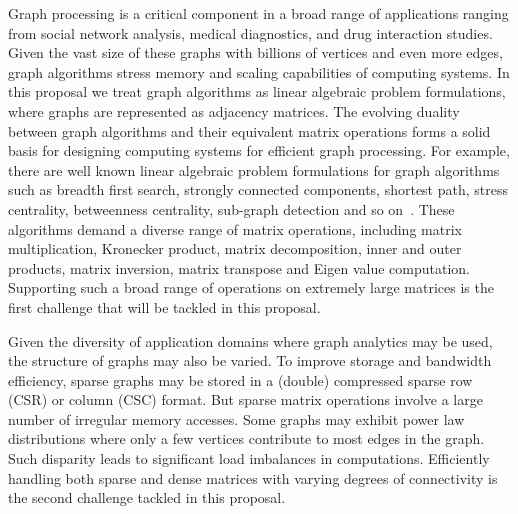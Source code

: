 \noindent
Graph processing is a critical component in a broad range of applications ranging from social network analysis, medical diagnostics, and drug interaction studies.  
Given the vast size of these graphs with billions of vertices and even more edges, graph algorithms stress memory and scaling capabilities of computing systems. 
In this proposal we treat graph algorithms as linear algebraic problem formulations, where graphs are represented as adjacency matrices.  
The evolving duality between graph algorithms and their equivalent matrix operations forms a solid basis for 
designing computing systems %
for efficient graph processing.
For example, there are well known linear algebraic problem formulations for graph algorithms such as breadth first search, strongly connected components, shortest path, stress centrality, betweenness centrality, sub-graph detection and so on~\cite{kepner2011graph}.  
These algorithms demand a diverse range of matrix operations, including matrix multiplication, Kronecker product,  matrix decomposition, inner and outer products, matrix inversion, matrix transpose and Eigen value computation.  
Supporting such a broad range of operations on extremely large matrices is the first challenge that will be tackled in this proposal. 


Given the diversity of application domains where graph analytics may be used, the structure of graphs may also be varied. 
To improve storage and bandwidth efficiency, sparse graphs may be stored in  a (double) compressed sparse row (CSR) or column (CSC) format. 
But sparse matrix operations involve a large number of irregular memory accesses.
Some graphs may exhibit power law distributions where only a few vertices contribute to most edges in the graph. 
Such disparity leads to significant load imbalances in computations.  
Efficiently handling both sparse and dense matrices with varying degrees of connectivity is the second challenge tackled in this proposal. 

